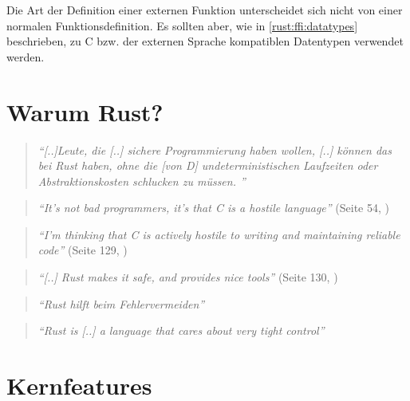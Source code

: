 Die Art der Definition einer externen Funktion unterscheidet sich nicht von einer normalen Funktionsdefinition. Es sollten aber, wie in \autoref{rust:ffi:datatypes} beschrieben, zu C bzw. der externen Sprache kompatiblen Datentypen verwendet werden.
 

\section{Warum Rust?}

\begin{quotation}
	\textit{\enquote{[..]Leute, die [..] sichere Programmierung haben wollen, [..] können das bei Rust haben, ohne die [von D] undeterministischen Laufzeiten oder Abstraktionskosten schlucken zu müssen. }}
	\cite{rust:fefe}
\end{quotation}




\begin{quotation}
	\textit{\enquote{It’s not bad programmers, it’s that C is a hostile language}} 
	(Seite 54, \cite{rust:c_is_hostile_mena})
\end{quotation}

\begin{quotation}
	\textit{\enquote{I’m thinking that C is actively hostile to writing and maintaining reliable code}} 
	(Seite 129, \cite{rust:c_is_hostile_mena})
\end{quotation}

\begin{quotation}
	\textit{\enquote{[..] Rust makes it safe, and  provides nice tools}} 
	(Seite 130, \cite{rust:c_is_hostile_mena})
\end{quotation}


\begin{quotation}
	\textit{\enquote{Rust hilft beim Fehlervermeiden}} 
	\cite{rust:c_is_hostile_golem}
\end{quotation}

\begin{quotation}
	\textit{\enquote{Rust is [..] a language that cares about very tight control}}
	\cite{rust:tight_control}
\end{quotation}

 \cite{rust:orly_y_rust}

\section{Kernfeatures}

